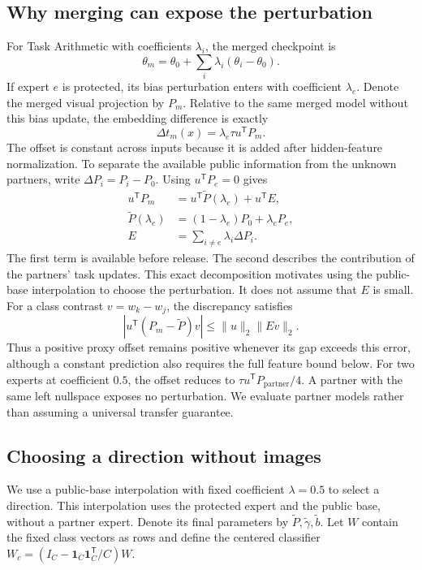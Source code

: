 \subsection{Why merging can expose the perturbation}
For Task Arithmetic with coefficients $\lambda_i$, the merged checkpoint is
\begin{equation}
 \theta_m=\theta_0+\sum_i\lambda_i(\theta_i-\theta_0).
 \label{eq:ta}
\end{equation}
If expert $e$ is protected, its bias perturbation enters with coefficient $\lambda_e$. Denote the merged visual projection by $P_m$. Relative to the same merged model without this bias update, the embedding difference is exactly
\begin{equation}
 \Delta t_m(x)=\lambda_e\tau u^{\mathsf T}P_m.
 \label{eq:exposure}
\end{equation}
The offset is constant across inputs because it is added after hidden-feature normalization. To separate the available public information from the unknown partners, write $\Delta P_i=P_i-P_0$. Using $u^{\mathsf T}P_e=0$ gives
\begin{equation}
\begin{aligned}
 u^{\mathsf T}P_m
 &=u^{\mathsf T}\widetilde P(\lambda_e)+u^{\mathsf T}E,\\
 \widetilde P(\lambda_e)&=(1-\lambda_e)P_0+\lambda_eP_e,\\
 E&=\sum_{i\ne e}\lambda_i\Delta P_i.
\end{aligned}
\label{eq:partners}
\end{equation}
The first term is available before release. The second describes the contribution of the partners' task updates. This exact decomposition motivates using the public-base interpolation to choose the perturbation. It does not assume that $E$ is small. For a class contrast $v=w_k-w_j$, the discrepancy satisfies
\begin{equation}
 |u^{\mathsf T}(P_m-\widetilde P)v|
 \leq \|u\|_2\|Ev\|_2.
 \label{eq:partnererror}
\end{equation}
Thus a positive proxy offset remains positive whenever its gap exceeds this error, although a constant prediction also requires the full feature bound below. For two experts at coefficient $0.5$, the offset reduces to $\tau u^{\mathsf T}P_{\mathrm{partner}}/4$. A partner with the same left nullspace exposes no perturbation. We evaluate partner models rather than assuming a universal transfer guarantee.

\subsection{Choosing a direction without images}
We use a public-base interpolation with fixed coefficient $\lambda=0.5$ to select a direction. This interpolation uses the protected expert and the public base, without a partner expert. Denote its final parameters by $\widetilde P,\widetilde\gamma,\widetilde b$. Let $W$ contain the fixed class vectors as rows and define the centered classifier $W_c=(I_C-\mathbf{1}_C\mathbf{1}_C^{\mathsf T}/C)W$.

